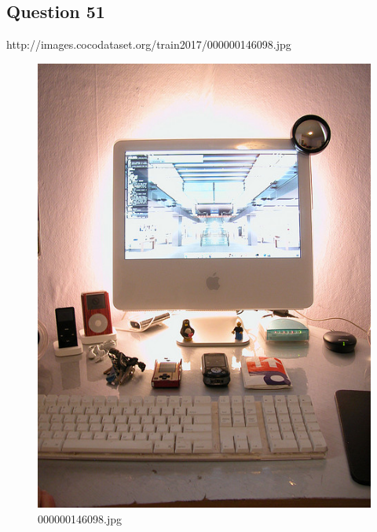 \subsection*{Question 51}
http://images.cocodataset.org/train2017/000000146098.jpg
\begin{figure}[h]
    \centering
    \includegraphics[width=0.8\linewidth]{../image set/hard/000000146098.jpg}
    \caption{000000146098.jpg}
\end{figure}
